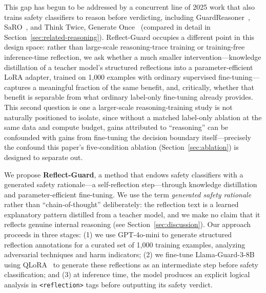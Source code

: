 \documentclass[Superintelligence,article,submit,pdftex,moreauthors]{Definitions/mdpi}
\begin{document}
This gap has begun to be addressed by a concurrent line of 2025 work that also trains safety classifiers to reason before verdicting, including GuardReasoner~\citep{liu2025guardreasoner}, SaRO~\citep{mou2025saro}, and Think Twice, Generate Once~\citep{phan2025thinktwice} (compared in detail in Section~\ref{sec:related-reasoning}). Reflect-Guard occupies a different point in this design space: rather than large-scale reasoning-trace training or training-free inference-time reflection, we ask whether a much smaller intervention---knowledge distillation of a teacher model's structured reflections into a parameter-efficient LoRA adapter, trained on 1{,}000 examples with ordinary supervised fine-tuning---captures a meaningful fraction of the same benefit, and, critically, whether that benefit is separable from what ordinary label-only fine-tuning already provides. This second question is one a larger-scale reasoning-training study is not naturally positioned to isolate, since without a matched label-only ablation at the same data and compute budget, gains attributed to ``reasoning'' can be confounded with gains from fine-tuning the decision boundary itself---precisely the confound this paper's five-condition ablation (Section~\ref{sec:ablation}) is designed to separate out.

We propose \textbf{Reflect-Guard}, a method that endows safety classifiers with a generated safety rationale---a self-reflection step---through knowledge distillation and parameter-efficient fine-tuning. We use the term \emph{generated safety rationale} rather than ``chain-of-thought'' deliberately: the reflection text is a learned explanatory pattern distilled from a teacher model, and we make no claim that it reflects genuine internal reasoning (see Section~\ref{sec:discussion}). Our approach proceeds in three stages: (1) we use GPT-4o-mini to generate structured reflection annotations for a curated set of 1{,}000 training examples, analyzing adversarial techniques and harm indicators; (2) we fine-tune Llama-Guard-3-8B using QLoRA~\citep{dettmers2024qlora} to generate these reflections as an intermediate step before safety classification; and (3) at inference time, the model produces an explicit logical analysis in \texttt{<reflection>} tags before outputting its safety verdict.
\end{document}
